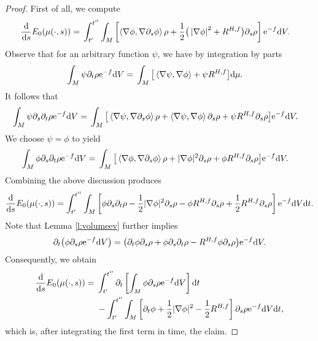 \documentclass[11pt]{article}
\numberwithin{equation}{section}
\numberwithin{equation}{section}
\newcommand{\del}{\partial}
\newcommand{\brs}[1]{\left| #1 \right|}
\newcommand{\N}{\nabla}
\newcommand{\IP}[1]{\left<#1\right>}
\begin{document}
\begin{proof}
	First of all, we compute
	\begin{align*}
	\frac{{\rm d}}{{\rm d}s}E_0(\mu(\cdot,s)) ={}&\int_{t'}^{t''} \int_M \left[ \IP{\N \phi, \N \partial_s \phi} \rho + \frac{1}{2}\big( \brs{\N \phi}^2 + R^{H,f} \big) \partial_s \rho \right] {\rm e}^{-f} {\rm d}V.
	\end{align*}
	Observe that for an arbitrary function $\psi$, we have by integration by parts
	\begin{align*}
	\int_M \psi {\del_t \rho} {\rm e}^{-f} {\rm d}V
	={}&\int_M \big[ \IP{\N \psi, \N \phi} + \psi R^{H,f} \big] {\rm d}\mu.
	\end{align*}
	It follows that
	\begin{align*}
	\int_M \psi {\del_s\del_t \rho} {\rm e}^{-f} {\rm d}V ={}&\int_M \big[ \IP{\N \psi, \N {\del_s \phi}} \rho + \IP{\N \psi, \N \phi} {\del_s \rho} + \psi R^{H,f}\del_s\rho \big] {\rm e}^{-f} {\rm d}V.
	\end{align*}
	We choose $\psi = \phi$ to yield
	\begin{align*}
	\int_M \phi {\del_s\del_t \rho} {\rm e}^{-f} {\rm d}V ={}&\int_M \big[ \IP{\N \phi, \N {\del_s \phi}} \rho + |\N \phi|^2 {\del_s \rho} + \phi R^{H,f}\del_s\rho \big] {\rm e}^{-f} {\rm d}V.
	\end{align*}
	Combining the above discussion produces
	\begin{align*}
	\frac{{\rm d}}{{\rm d}s}E_0(\mu(\cdot,s))=\int_{t'}^{t''}\int_M\left[ \phi \del_s\del_t\rho -\frac12|\N\phi|^2 \del_s\rho-\phi R^{H,f} \del_s\rho+\frac12 R^{H,f} \del_s\rho\right] {\rm e}^{-f} {\rm d}V{\rm d}t.
	\end{align*}
	Note that Lemma \ref{l:volumeev} further implies
	\begin{align*}
	\del_t\big(\phi \del_s\rho {\rm e}^{-f} {\rm d}V\big)=\big(\del_t\phi \del_s\rho +\phi \del_s\del_t\rho - R^{H,f}\phi \del_s\rho \big){\rm e}^{-f} {\rm d}V.
	\end{align*}
	Consequently, we obtain
	\begin{align*}
	\frac{{\rm d}}{{\rm d}s} E_0(\mu(\cdot,s))={}& \int_{t'}^{t''} \del_t \left[ \int_M \phi\partial_s\rho {\rm e}^{-f} {\rm d}V \right] {\rm d}t \\
 &-\int_{t'}^{t''}\int_M\left[\del_t\phi+\frac12|\N\phi|^2-\frac12 R^{H,f}\right]\del_s\rho {\rm e}^{-f} {\rm d}V{\rm d}t,
	\end{align*}
	which is, after integrating the first term in time, the claim.
\end{proof}
\end{document}
